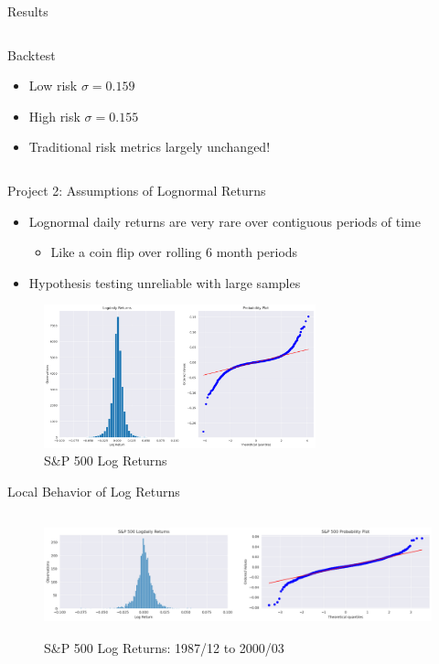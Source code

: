 \documentclass[presentation]{beamer}
\begin{document}
\begin{frame}[label={sec:org2cc18f4}]{Results}
\begin{columns}
\begin{column}{0.5\columnwidth}
\begin{block}{Backtest}
\begin{itemize}
\item \tiny{Low risk \(\sigma =0.159\)}
\item \tiny{High risk \(\sigma =0.155\)}
\item \tiny{Traditional risk metrics largely unchanged!}
\end{itemize}
\vspace{0.5}
\end{block}
\end{column}
\end{columns}
\end{frame}
\begin{frame}[label={sec:orgb67c8a8}]{Project 2: Assumptions of Lognormal Returns}
\begin{itemize}
\item Lognormal daily returns are \alert{very rare} over contiguous periods of time
\begin{itemize}
\item Like a coin flip over rolling 6 month periods
\end{itemize}
\item Hypothesis testing unreliable with large samples
\end{itemize}

\begin{figure}[htbp]
\centering
\includegraphics[width=0.7\textwidth]{./figures/sp500-probplots.png}
\caption{S\&P 500 Log Returns}
\end{figure}
\end{frame}
\begin{frame}[label={sec:org5db85f6}]{Local Behavior of Log Returns}
\begin{figure}[htbp]
\centering
\includegraphics[width=\textwidth,height=3.5cm]{./figures/sp500-bull-probplot.png}
\caption{S\&P 500 Log Returns: 1987/12 to 2000/03}
\end{figure}
\end{frame}
\end{document}
